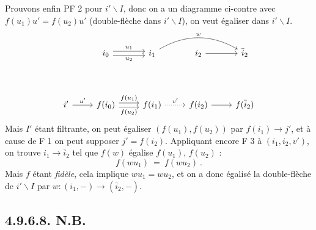 \documentclass[11pt]{article}
\newcommand{\bs}{\backslash}
\begin{document}
Prouvons enfin PF 2 pour $i'\bs I$, donc on a un diagramme ci-contre avec $f(u_1)u' = f(u_2)u'$ (double-flèche dans $i'\bs I$), on veut égaliser dans $i'\bs I$.
\[
\begin{tikzcd}
{} & i_0 \arrow[r, shift left, "u_1"] \arrow[r, shift right, "u_2"'] & i_1 \arrow[rr, bend left, "w"] & i_2 \arrow[r] & \bar{i}_2 \\
{} & {} & {} & {} & {} \\
i' \arrow[r, "u'"] & f(i_0) \arrow[r, shift left, "f(u_1)"] \arrow[r, shift right, "f(u_2)"'] & f(i_1) \arrow[r, dotted, "v'"] & f(i_2) \arrow[r] & f(\bar{i}_2)
\end{tikzcd}
\]
Mais $I'$ étant filtrante, on peut égaliser $(f(u_1), f(u_2))$ par $f(i_1) \longrightarrow j'$, et à cause de F 1 on peut supposer $j' = f(i_2)$. Appliquant encore F 3 à $(i_1, i_2, v')$, on trouve $i_1 \longrightarrow \bar{i}_2$ tel que $f(w)$ égalise $f(u_1)$, $f(u_2)$ :
\[
f(wu_1) \ = \ f(wu_2) \ .
\]
Mais $f$ étant \textit{fidèle}, cela implique $wu_1 = wu_2$, et on a donc égalisé la double-flèche de $i'\bs I$ par $w : (i_1, -) \longrightarrow (\bar{i}_2, -)$.

\subsection*{4.9.6.8. N.B.}
\end{document}
